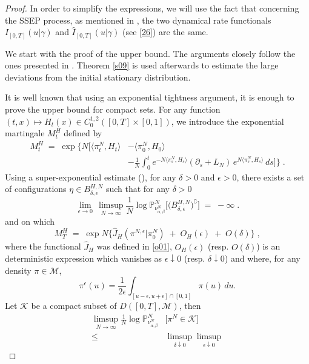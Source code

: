 \documentclass[reqno]{amsart}
\begin{document}
\begin{proof}
In order to simplify the expressions, we will use the fact that
concerning the SSEP process, as mentioned in \cite[last part of
section 2]{blm1}, the two dynamical rate functionals
$I_{[0,T]}(u|\gamma)$ and $\hat I_{[0,T]}(u|\gamma)$ (see \eqref{26})
are the same.

We start with the proof of the upper bound.  The arguments closely
follow the ones presented in \cite{blm1}. Theorem \ref{s09} is used
afterwards to estimate the large deviations from the initial
stationary distribution.

It is well known that using an exponential tightness argument, it is
enough to prove the upper bound for compact sets.  For any function
$(t,x)\mapsto H_t(x)\in C_0^{1,2}([0,T]\times[0,1])$, we introduce the
exponential martingale $M^H_t$ defined by
\[
\begin{split}
M^H_t \;=\; \exp \Big\{ N \Big[ {\langle}\pi^N_t, H_t{\rangle} 
&- {\langle}\pi^N_0, H_0{\rangle} \\
&- \frac 1N \int_0^t e^{- N {\langle}\pi^N_s, H_s{\rangle}} (\partial_s + L_N) 
\, e^{N{\langle}\pi^N_s, H_s{\rangle}} \,ds \Big] \Big\}\; .  
\end{split}
\]
Using a super-exponential estimate (\cite[Theorem
3.2]{blm1}), for any $\delta>0$ and $\epsilon>0$, there exists a set of configurations
$\eta\in B^{H,N}_{\delta , \epsilon}$ such that for any $\delta>0$
\[
\lim_{\epsilon\to 0}\,\limsup_{N\to\infty} \frac 1N  \log
{{\mathbb P}}^N_{\nu^N_{\alpha, \beta}} \Big [ \big(B^{H,N}_{\delta , \epsilon} \big)^\complement\Big] \; 
=\; -\infty \; .
\]
and on which
\begin{equation*}
M^H_T \;=\;  \exp N\Big\{  \hat J_{H} (\pi^{N,\epsilon}|\pi^N_0) 
\; +\; O_H (\epsilon) \;+\; O(\delta) \Big\} \;,
\end{equation*}
where the functional $\hat J_H$ was defined in \eqref{o01}, $O_{H}
(\epsilon)$ (resp. $O(\delta)$) is an deterministic expression which vanishes as
$\epsilon \downarrow 0$ (resp. $\delta \downarrow 0$) and where, for
any density $\pi\in {{\mathscr M}}$,
\[
\pi^\epsilon(u)=
\frac 1{2\epsilon}\int_{[u-\epsilon,u+\epsilon]\cap[0,1]}\!\!
\pi(u)\,du.
\]
Let ${{\mathscr K}}$ be a compact subset of $D([0,T], {{\mathscr M}})$, then
\[
\begin{split}
 \limsup_{N\to\infty} \frac 1N  \log
{{\mathbb P}}^N_{\nu^N_{\alpha, \beta}}
&\big[\pi^N\in{{\mathscr K}}\big]
\\
\le 
&\limsup_{\delta\downarrow 0}\limsup_{\epsilon\downarrow 0}

\end{split}\]
\end{proof}
\end{document}
